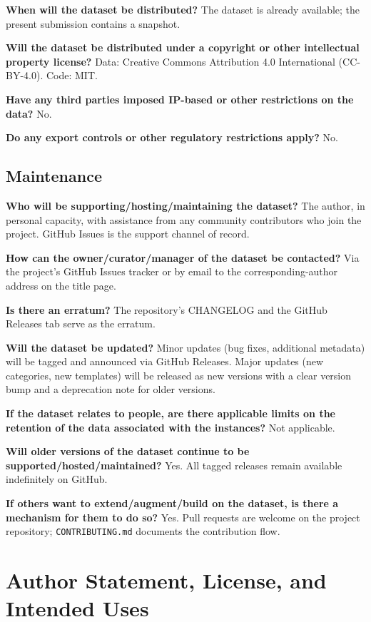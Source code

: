 \documentclass{article}
\begin{document}
\textbf{When will the dataset be distributed?}
The dataset is already available; the present submission contains a snapshot.

\textbf{Will the dataset be distributed under a copyright or other intellectual property license?}
Data: Creative Commons Attribution 4.0 International (CC-BY-4.0). Code: MIT.

\textbf{Have any third parties imposed IP-based or other restrictions on the data?}
No.

\textbf{Do any export controls or other regulatory restrictions apply?}
No.

\subsection*{Maintenance}

\textbf{Who will be supporting/hosting/maintaining the dataset?}
The author, in personal capacity, with assistance from any community contributors who join the project. GitHub Issues is the support channel of record.

\textbf{How can the owner/curator/manager of the dataset be contacted?}
Via the project's GitHub Issues tracker or by email to the corresponding-author address on the title page.

\textbf{Is there an erratum?}
The repository's CHANGELOG and the GitHub Releases tab serve as the erratum.

\textbf{Will the dataset be updated?}
Minor updates (bug fixes, additional metadata) will be tagged and announced via GitHub Releases. Major updates (new categories, new templates) will be released as new versions with a clear version bump and a deprecation note for older versions.

\textbf{If the dataset relates to people, are there applicable limits on the retention of the data associated with the instances?}
Not applicable.

\textbf{Will older versions of the dataset continue to be supported/hosted/maintained?}
Yes. All tagged releases remain available indefinitely on GitHub.

\textbf{If others want to extend/augment/build on the dataset, is there a mechanism for them to do so?}
Yes. Pull requests are welcome on the project repository; \texttt{CONTRIBUTING.md} documents the contribution flow.


\section{Author Statement, License, and Intended Uses}
\label{app:author_statement}
\end{document}
